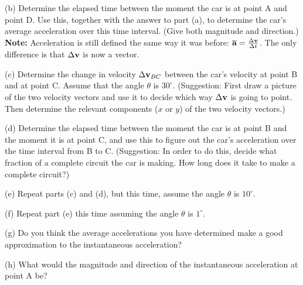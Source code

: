 \vfil

(b) Determine the elapsed time between the moment the car is at point A
and point D.  Use this, together with the answer to part (a), to determine
the car's average acceleration over this time interval.  (Give both magnitude
and direction.)  {\bf Note:} Acceleration is still defined the same
way it was before: $\overline{\bf a}=\frac{\Delta \bf v}{\Delta t}$.
The only difference is that $\Delta{\bf v}$ is now a vector.


\vfil\eject

(c) Determine the change in velocity $\Delta {\bf v}_{BC}$ between the
car's velocity at point B and at point C.  Assume that the angle $\theta$
is $30^\circ$.  (Suggestion: First draw a picture of the two
velocity vectors and use it to decide which way
$\Delta{\bf v}$ is going to point.  Then determine the relevant
components ($x$ or $y$) of the two velocity vectors.)

\vfil

(d) Determine the elapsed time between the moment the car is at
point B and the moment it is at point C, and use this to figure out
the car's acceleration over the time interval from B to C.
(Suggestion: In order to do this, decide what fraction of a complete
circuit the car is making.  How long does it take to make a complete circuit?)

\vfil\eject

(e) Repeat parts (c) and (d), but this time, assume the angle $\theta$ is 
$10^\circ$.

\vfil

(f) Repeat part (e) this time assuming the angle $\theta$ is 
$1^\circ$.

\vfil

(g) Do you think the average accelerations you have determined make a good
approximation to the instantaneous acceleration?

\vskip 0.8in

(h) What would the magnitude and direction of the instantaneous acceleration
at point A be?

\vskip 0.8in\eject

